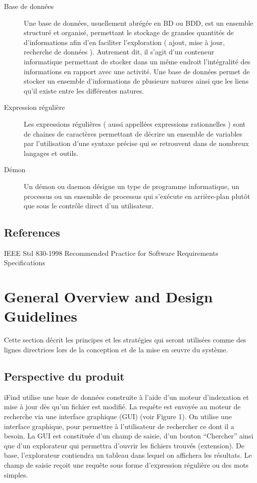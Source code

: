 \documentclass[a4paper,10pt]{report}
\begin{document}
\begin{description}
\item[Base de données]
 Une base de données, usuellement abrégée en BD ou BDD, est un ensemble
structuré et organisé, permettant le stockage de grandes quantités de
d'informations afin d'en faciliter l'exploration ( ajout, mise à jour, recherche
de données ). Autrement dit, il s’agit d’un conteneur informatique permettant de
stocker dans un même endroit l'intégralité des informations en rapport avec une
activité. Une base de données permet de stocker un ensemble d'informations de
plusieurs natures ainsi que les liens qu'il existe entre les différentes
natures.

\item[Expression régulière]
 Les expressions régulières ( aussi appellées expressions rationnelles ) sont de
chaines de caractères permettant de décrire un ensemble de variables par
l'utilisation d'une syntaxe précise qui se retrouvent dans de nombreux langages
et outils.
 
\item[Démon]
 Un démon ou daemon désigne un type de programme informatique, un processus ou
un ensemble de processus qui s'exécute en arrière-plan plutôt que sous le
contrôle direct d'un utilisateur.
\end{description}

\subsection{References}
IEEE Std 830-1998 Recommended Practice for Software Requirements Specifications 



\section{General Overview and Design Guidelines}
Cette section décrit les principes et les stratégies qui seront utilisées comme
des lignes directrices lors de la conception et de la mise en œuvre du système.

\subsection{Perspective du produit}
iFind utilise une base de données construite à l'aide d'un moteur d'indexation
et mise à jour dès qu'un fichier est modifié. 
La requête est envoyée au moteur de recherche via une interface graphique (GUI)
(voir Figure 1). 
On utilise une interface graphique, pour permettre à l’utilisateur de rechercher
ce dont il a besoin.
La GUI est constituée d’un champ de saisie, d’un bouton “Chercher” ainsi que
d’un explorateur qui permettra d’ouvrir les fichiers trouvés (extension). 
De base, l’explorateur contiendra un tableau dans lequel on affichera les
résultats. 
Le champ de saisie reçoit une requête sous forme d’expression régulière ou des
mots simples. 
\end{document}
